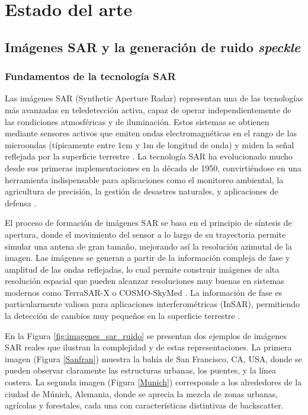 \chapter{Estado del arte}
\label{estado_del_arte}

\section{Imágenes SAR y la generación de ruido \emph{speckle}}

\subsection{Fundamentos de la tecnología SAR}

Las imágenes SAR (Synthetic Aperture Radar) representan una de las tecnologías más avanzadas en teledetección activa, capaz de operar independientemente de las condiciones atmosféricas y de iluminación. Estos sistemas se obtienen mediante sensores activos que emiten ondas electromagnéticas en el rango de las microondas (típicamente entre $1$cm y $1$m de longitud de onda) y miden la señal reflejada por la superficie terrestre \cite{moreira2013tutorial}. La tecnología SAR ha evolucionado mucho desde sus primeras implementaciones en la década de 1950, convirtiéndose en una herramienta indispensable para aplicaciones como el monitoreo ambiental, la agricultura de precisión, la gestión de desastres naturales, y aplicaciones de defensa \cite{cumming2005digital}.

El proceso de formación de imágenes SAR se basa en el principio de síntesis de apertura, donde el movimiento del sensor a lo largo de su trayectoria permite simular una antena de gran tamaño, mejorando así la resolución azimutal de la imagen. Las imágenes se generan a partir de la información compleja de fase y amplitud de las ondas reflejadas, lo cual permite construir imágenes de alta resolución espacial que pueden alcanzar resoluciones muy buenas en sistemas modernos como TerraSAR-X o COSMO-SkyMed \cite{werninghaus2010terrasar}. La información de fase es particularmente valiosa para aplicaciones interferométricas (InSAR), permitiendo la detección de cambios muy pequeños en la superficie terrestre \cite{rosen2000synthetic}.

En la Figura \ref{fig:imagenes_sar_ruido} se presentan dos ejemplos de imágenes SAR reales que ilustran la complejidad y de estas representaciones. La primera imagen (Figura \ref{Sanfran}) muestra la bahía de San Francisco, CA, USA, donde se pueden observar claramente las estructuras urbanas, los puentes, y la línea costera. La segunda imagen (Figura \ref{Munich}) corresponde a los alrededores de la ciudad de Múnich, Alemania, donde se aprecia la mezcla de zonas urbanas, agrícolas y forestales, cada una con características distintivas de backscatter.

